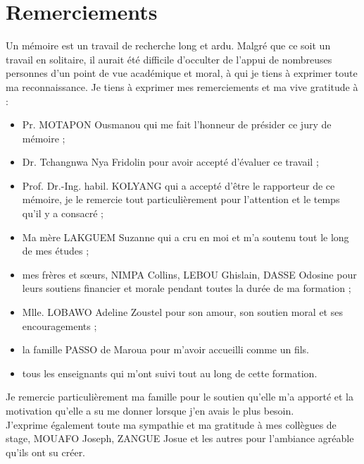 


 
\chapter*{Remerciements}

\hspace*{10pt}Un mémoire est un travail de recherche long et ardu. Malgré
que ce soit un travail en solitaire, il aurait été difficile d'occulter de l'appui de
nombreuses personnes d'un point de vue académique et moral, à qui je tiens à exprimer toute ma reconnaissance. Je tiens à exprimer mes remerciements et ma vive gratitude à : 
\begin{itemize}
		\item[\textbullet]	Pr. MOTAPON Ousmanou qui me fait l'honneur de présider ce jury de mémoire ;
		\item[\textbullet]  Dr. Tchangnwa  Nya Fridolin pour avoir accepté d'évaluer ce travail ;
		\item[\textbullet]  Prof. Dr.-Ing. habil. KOLYANG  qui a accepté d'être le rapporteur de ce mémoire, je le remercie tout particulièrement pour l'attention et le temps qu'il y a consacré ;
		\item[\textbullet]	Ma mère LAKGUEM Suzanne qui a cru en moi et m'a soutenu tout le long de mes études ;
		\item[\textbullet]  mes frères et sœurs, NIMPA Collins, LEBOU Ghislain, DASSE Odosine pour leurs soutiens financier et morale pendant toutes la durée de ma formation ;
		\item[\textbullet]	Mlle. LOBAWO Adeline Zoustel pour son amour, son soutien moral et ses encouragements ;
		\item[\textbullet]  la famille PASSO de Maroua pour m'avoir accueilli comme un fils. 
		\item[\textbullet]  tous les enseignants qui m'ont suivi tout au long de cette formation.
		\end{itemize}
	
	 Je remercie particulièrement ma famille pour le soutien qu'elle m'a apporté et la
motivation qu'elle a su me donner lorsque j'en avais le plus besoin.\\

 J'exprime  également  toute  ma  sympathie  et  ma  gratitude à mes collègues de stage, MOUAFO Joseph, ZANGUE Josue et les autres pour l'ambiance agréable qu'ils ont su créer.\\ 



